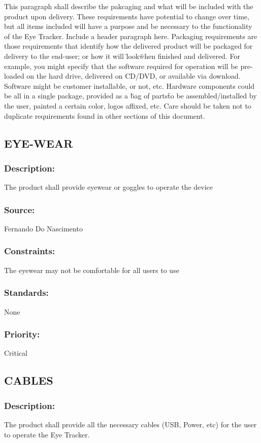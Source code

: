This paragraph shall describe the pakcaging and what will be included with the product upon delivery. These requirements have potential to change over time, but all items included will have a purpose and be necessary to the functionality of the Eye Tracker.
Include a header paragraph here. Packaging requirements are those requirements that identify how the delivered product will be packaged for delivery to the end-user; or how it will \"look\" when finished and delivered. For example, you might specify that the software required for operation will be pre-loaded on the hard drive, delivered on CD/DVD, or available via download. Software might be customer installable, or not, etc. Hardware components could be all in a single package, provided as a \"bag of parts\" to be assembled/installed by the user, painted a certain color, logos affixed, etc. Care should be taken not to duplicate requirements found in other sections of this document.

\subsection{\text EYE-WEAR}
\subsubsection{Description:} 
	{The product shall provide eyewear or goggles to operate the device}
\subsubsection{Source:} 
	{Fernando Do Nascimento}
\subsubsection{Constraints:} 
	{The eyewear may not be comfortable for all users to use}
\subsubsection{Standards: }
	{None}
\subsubsection{Priority:} {Critical}
\newline

\subsection{\text CABLES}
\subsubsection{Description:}
	{The product shall provide all the necessary cables (USB, Power, etc) for the user to operate the Eye Tracker.}
